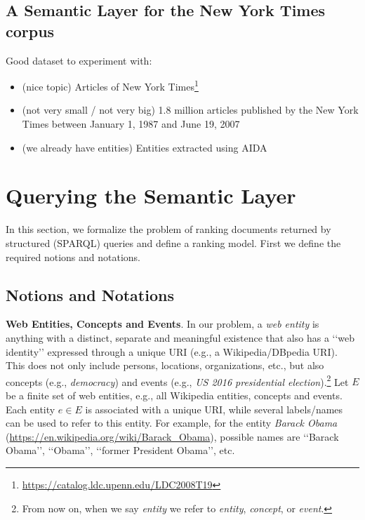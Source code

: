 \documentclass[runningheads,a4paper]{libtex/llncs}
\newcommand{\q}[1]{\lq\lq{}{}#1\rq\rq{}{}}
\begin{document}
\subsection{A Semantic Layer for the New York Times corpus}

Good dataset to experiment with:

\begin{itemize}
\item   (nice topic) Articles of New York Times\footnote{\url{https://catalog.ldc.upenn.edu/LDC2008T19}}
\item   (not very small / not very big) 1.8 million articles published by the New York Times between January 1, 1987 and June 19, 2007
\item   (we already have entities) Entities extracted using AIDA
\end{itemize}



\pagebreak
\section{Querying the Semantic Layer}
\label{sec:queryingSemLayer}

In this section, we formalize the problem of ranking documents returned by
structured (SPARQL) queries and define a ranking model.
First we define the required notions and notations.

\subsection{Notions and Notations}

{\bf Web Entities, Concepts and Events}.
In our problem, a {\em web entity} is anything with a distinct, separate and meaningful existence
that also has a \q{web identity} expressed through a unique URI (e.g., a Wikipedia/DBpedia URI).
This does not only include persons, locations, organizations, etc., but also
concepts (e.g., {\em democracy}) and
events (e.g., {\em US 2016 presidential election}).\footnote{From now on,
when we say {\em entity} we refer to {\em entity}, {\em concept}, or {\em event}.}
Let $E$ be a finite set of web entities, e.g., all Wikipedia entities, concepts and events.
Each entity $e \in E$ is associated with a unique URI, while several labels/names
can be used to refer to this entity.
For example, for the entity {\em Barack Obama} (\url{https://en.wikipedia.org/wiki/Barack_Obama}),
possible names are \q{Barack Obama}, \q{Obama}, \q{former President Obama}, etc.
\end{document}
